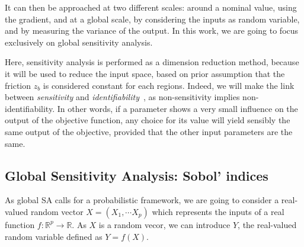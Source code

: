 \documentclass[../../Main_ManuscritThese.tex]{subfiles}
\newcommand{\zob}{z_b}
\begin{document}
It can then be approached at two different scales:
around a nominal value, using the gradient, and at a global scale, by
considering the inputs as random variable, and by measuring the
variance of the output. In this work, we are going to focus
exclusively on global sensitivity analysis.

Here, sensitivity analysis is performed as a dimension reduction
method, because it will be used to reduce the input space, based on
prior assumption that the friction $\zob$ is considered constant for
each regions. Indeed, we will make the link between \emph{sensitivity}
and \emph{identifiability}~\cite{dobre_global_2010}, as
non-sensitivity implies non-identifiability. In other words, if a
parameter shows a very small influence on the output of the objective
function, any choice for its value will yield sensibly the same output
of the objective, provided that the other input parameters are the
same.



\subsection{Global Sensitivity Analysis: Sobol' indices}
\label{sec:sobol-indices}
As global SA calls for a probabilistic framework, we are going to
consider a real-valued random vector $X=(X_1,\cdots X_p)$ which
represents the inputs of a real function
$f: \mathbb{R}^p\rightarrow \mathbb{R}$.  As $X$ is a random vecor, we
can introduce $Y$, the real-valued random variable defined as
$Y=f(X)$.
\end{document}
